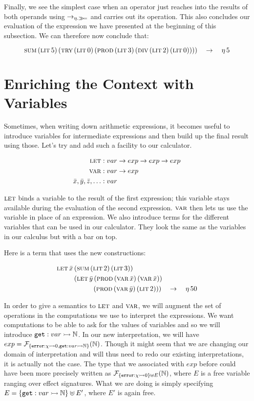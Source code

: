 Finally, we see the simplest case when an operator just reaches into the
results of both operands using $\to_{\eta.\mathbin{\gg\!=}}$ and carries out its
operation. This also concludes our evaluation of the expression we have
presented at the beginning of this subsection. We can therefore now
conclude that:

$$
\textsc{sum}\,(\textsc{lit}\,5)\,(\textsc{try}\,(\textsc{lit}\,0)\,(\textsc{prod}\,(\textsc{lit}\,3)\,(\textsc{div}\,(\textsc{lit}\,2)\,(\textsc{lit}\,0))))
\quad \to \quad \eta\,5
$$


\section{Enriching the Context with Variables}
\label{sec:enriching-the-context-with-variables}

Sometimes, when writing down arithmetic expressions, it becomes useful to
introduce variables for intermediate expressions and then build up the
final result using those. Let's try and add such a facility to our
calculator.

\begin{align*}
  \textsc{let} &: var \to exp \to exp \to exp \\
  \textsc{var} &: var \to exp \\
  \bar{x}, \bar{y}, \bar{z},\ldots &: var
\end{align*}

$\textsc{let}$ binds a variable to the result of the first expression; this
variable stays available during the evaluation of the second
expression. $\textsc{var}$ then lets us use the variable in place of an
expression. We also introduce terms for the different variables that can be
used in our calculator. They look the same as the variables in our calculus
but with a bar on top.

Here is a term that uses the new constructions:

\begin{align*}
& \letecn{x}{\sumec{\litec{2}}{\litec{3}}}
 {\\ & \hspace{9mm} \letec{y}{\prodec{\varec{x}}{\varec{x}}}
 {\\ & \hspace{19mm} \prodec{\varec{y}}{\litec{2}}}} \quad \to \quad \ap{\eta}{50}
\end{align*}

In order to give a semantics to $\textsc{let}$ and $\textsc{var}$, we will augment the
set of operations in the computations we use to interpret the
expressions. We want computations to be able to ask for the values of
variables and so we will introduce $\mathtt{get} : var \rightarrowtail \mathbb{N}$. In our new
interpretation, we will have $exp =
\mathcal{F}_{\{\mathtt{error} : \chi \rightarrowtail 0,\mathtt{get} : var \rightarrowtail \mathbb{N}\}}(\mathbb{N})$. Though it
might seem that we are changing our domain of interpretation and will thus
need to redo our existing interpretations, it is actually not the case. The
type that we associated with $exp$ before could have been more precisely
written as $\mathcal{F}_{\{\mathtt{error} : \chi \rightarrowtail 0\} \uplus E}(\mathbb{N})$, where $E$ is
a free variable ranging over effect signatures. What we are doing is simply
specifying $E = \{\mathtt{get} : var \rightarrowtail \mathbb{N}\} \uplus E'$, where $E'$ is again
free.

